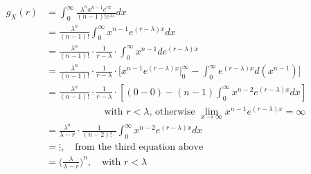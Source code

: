 \documentclass[UTF8]{article}
\begin{document}
\begin{enumerate}
            \begin{equation*}
                \begin{split}
                    g_X(r) &=\int^\infty_{0}\frac{\lambda^nx^{n-1}e^{rx}}{(n-1)!e^{\lambda x}}dx\\
                    &=\frac{\lambda^n}{(n-1)!}\int^\infty_0x^{n-1}e^{(r-\lambda)x}dx\\
                    &=\frac{\lambda^n}{(n-1)!}\cdot\frac{1}{r-\lambda}\cdot\int^\infty_0x^{n-1}de^{(r-\lambda)x}\\
                    &=\frac{\lambda^n}{(n-1)!}\cdot\frac{1}{r-\lambda}\cdot\bigg[x^{n-1}e^{(r-\lambda)x}\bigg|^\infty_0-\int^\infty_0e^{(r-\lambda)x}d(x^{n-1})\bigg]\\
                    &=\frac{\lambda^n}{(n-1)!}\cdot\frac{1}{r-\lambda}\cdot[(0-0)-(n-1)\int^\infty_0x^{n-2}e^{(r-\lambda)x}dx]\\
                    & \qquad\qquad\qquad\text{with $r<\lambda$, otherwise $\lim_{x\rightarrow\infty}x^{n-1}e^{(r-\lambda)x}=\infty$}\\\
                    &= \frac{\lambda^n}{\lambda-r}\cdot\frac{1}{(n-2)!\cdot}\int^\infty_0x^{n-2}e^{(r-\lambda)x}dx\\
                    &=\vdots,\quad\text{from the third equation above}\\
                    &=\bigg(\frac{\lambda}{\lambda-r}\bigg)^n,\quad\text{with $r<\lambda$}
                \end{split}
            \end{equation*}


\end{enumerate}
\end{document}
